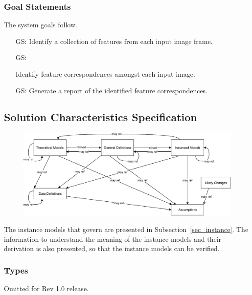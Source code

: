\documentclass[12pt]{article}
\newcounter{goalnum} %
\begin{document}
\subsubsection{Goal Statements}
\noindent The system goals follow.

\begin{itemize}
  \item[GS\refstepcounter{goalnum}\thegoalnum \label{identify_features}:]
    Identify a collection of features from each input image frame. 
  \item[GS\refstepcounter{goalnum}\thegoalnum \label{identify_matches}:] 
  \item[] %
    Identify feature correspondences amongst each input image.
  \item[GS\refstepcounter{goalnum}\thegoalnum \label{report_matches}:]
    Generate a report of the identified feature correspondences.
    
\end{itemize}

\subsection{Solution Characteristics Specification}
\begin{figure}[H]
  \includegraphics[scale=1.0]{RelationsBetweenTM_GD_IM_DD_A.pdf}
\end{figure}

The instance models that govern \progname{} are presented in
Subsection~\ref{sec_instance}.  The information to understand the meaning of the
instance models and their derivation is also presented, so that the instance
models can be verified.

\subsubsection{Types}
Omitted for Rev 1.0 release.
\end{document}

